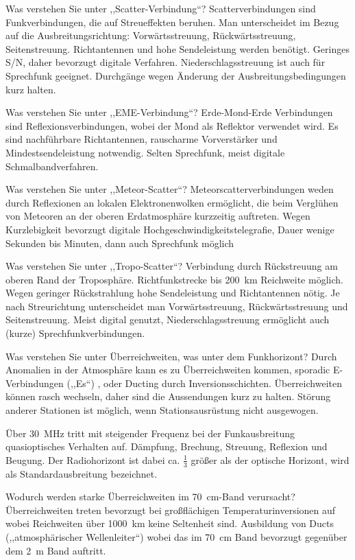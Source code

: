 \documentclass[avery5371,grid,frame,a4paper]{flashcards}
\newcommand{\card}[3]{
  \begin{flashcard}[{\chap} -- #1]{#2}#3\end{flashcard}
}
\begin{document}
\card{18}{Was verstehen Sie unter ,,Scatter-Verbindung``?}{
  Scatterverbindungen sind Funkverbindungen, die auf Streueffekten beruhen. Man unterscheidet im Bezug auf die Ausbreitungsrichtung: Vorwärtsstreuung, Rückwärtsstreuung, Seitenstreuung. Richtantennen und hohe Sendeleistung werden benötigt. Geringes S/N, daher bevorzugt digitale Verfahren. Niederschlagsstreuung ist auch für Sprechfunk geeignet. Durchgänge wegen Änderung der Ausbreitungsbedingungen kurz halten.
}
\card{19}{Was verstehen Sie unter ,,EME-Verbindung``?}{
  Erde-Mond-Erde Verbindungen sind Reflexionsverbindungen, wobei der Mond als Reflektor verwendet wird. Es sind nachführbare Richtantennen, rauscharme Vorverstärker und Mindestsendeleistung notwendig. Selten Sprechfunk, meist digitale Schmalbandverfahren.
}
\card{20}{Was verstehen Sie unter ,,Meteor-Scatter``?}{
  Meteorscatterverbindungen weden durch Reflexionen an lokalen Elektronenwolken ermöglicht, die beim Verglühen von Meteoren an der oberen Erdatmosphäre kurzzeitig auftreten. Wegen Kurzlebigkeit bevorzugt digitale Hochgeschwindigkeitstelegrafie, Dauer wenige Sekunden bis Minuten, dann auch Sprechfunk möglich
}
\card{21}{Was verstehen Sie unter ,,Tropo-Scatter``?}{
  Verbindung durch Rückstreuung am oberen Rand der Troposphäre. Richtfunkstrecke bis 200~km Reichweite möglich. Wegen geringer Rückstrahlung hohe Sendeleistung und Richtantennen nötig. Je nach Streurichtung unterscheidet man Vorwärtsstreuung, Rückwärtsstreuung und Seitenstreuung. Meist digital genutzt, Niederschlagsstreuung ermöglicht auch (kurze) Sprechfunkverbindungen.
}
\card{22}{Was verstehen Sie unter Überreichweiten, was unter dem Funkhorizont?}{
  Durch Anomalien in der Atmosphäre kann es zu Überreichweiten kommen, sporadic E-Verbindungen (,,Es``) , oder Ducting durch Inversionsschichten. Überreichweiten können rasch wechseln, daher sind die Aussendungen kurz zu halten. Störung anderer Stationen ist möglich, wenn Stationsausrüstung nicht ausgewogen.

  Über 30~MHz tritt mit steigender Frequenz bei der Funkausbreitung quasioptisches Verhalten auf. Dämpfung, Brechung, Streuung, Reflexion und Beugung. Der Radiohorizont ist dabei ca. $\frac13$ größer als der optische Horizont, wird als Standardausbreitung bezeichnet.
}
\card{23}{Wodurch werden starke Überreichweiten im 70~cm-Band verursacht?}{
  Überreichweiten treten bevorzugt bei großflächigen Temperaturinversionen auf wobei Reichweiten über 1000~km keine Seltenheit sind. Ausbildung von Ducts (,,atmosphärischer Wellenleiter``)  wobei das im 70~cm Band bevorzugt gegenüber dem 2~m Band auftritt.
}
\end{document}
